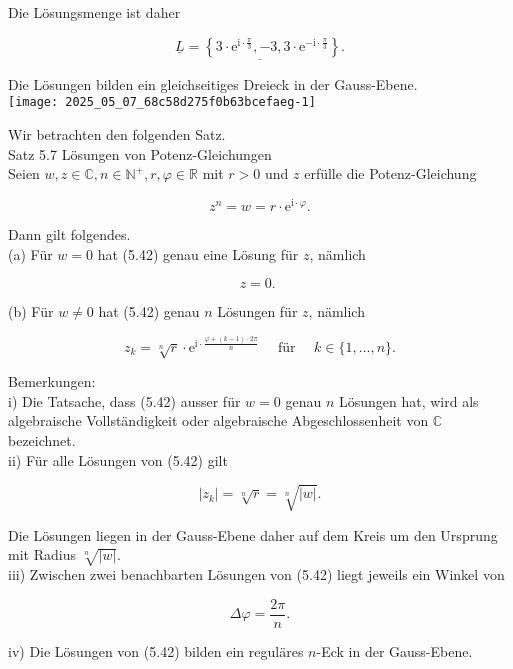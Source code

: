 \documentclass[10pt]{article}
\begin{document}
Die Lösungsmenge ist daher


\begin{equation*}
\underline{\underline{L}=\left\{3 \cdot \mathrm{e}^{\mathrm{i} \cdot \frac{\pi}{3}},-3,3 \cdot \mathrm{e}^{-\mathrm{i} \cdot \frac{\pi}{3}}\right\} .} \tag{5.41}
\end{equation*}


Die Lösungen bilden ein gleichseitiges Dreieck in der Gauss-Ebene.\\
\texttt{[image: 2025\_05\_07\_68c58d275f0b63bcefaeg-1]}

Wir betrachten den folgenden Satz.\\
Satz 5.7 Lösungen von Potenz-Gleichungen\\
Seien $w, z \in \mathbb{C}, n \in \mathbb{N}^{+}, r, \varphi \in \mathbb{R}$ mit $r>0$ und $z$ erfülle die Potenz-Gleichung


\begin{equation*}
z^{n}=w=r \cdot \mathrm{e}^{\mathrm{i} \cdot \varphi} . \tag{5.42}
\end{equation*}


Dann gilt folgendes.\\
(a) Für $w=0$ hat (5.42) genau eine Lösung für $z$, nämlich


\begin{equation*}
z=0 \text {. } \tag{5.43}
\end{equation*}


(b) Für $w \neq 0$ hat (5.42) genau $n$ Lösungen für $z$, nämlich


\begin{equation*}
z_{k}=\sqrt[n]{r} \cdot \mathrm{e}^{\mathrm{i} \cdot \frac{\varphi+(k-1) \cdot 2 \pi}{n}} \quad \text { für } \quad k \in\{1, \ldots, n\} . \tag{5.44}
\end{equation*}


Bemerkungen:\\
i) Die Tatsache, dass (5.42) ausser für $w=0$ genau $n$ Lösungen hat, wird als algebraische Vollständigkeit oder algebraische Abgeschlossenheit von $\mathbb{C}$ bezeichnet.\\
ii) Für alle Lösungen von (5.42) gilt


\begin{equation*}
\left|z_{k}\right|=\sqrt[n]{r}=\sqrt[n]{|w|} . \tag{5.45}
\end{equation*}


Die Lösungen liegen in der Gauss-Ebene daher auf dem Kreis um den Ursprung mit Radius $\sqrt[n]{|w|}$.\\
iii) Zwischen zwei benachbarten Lösungen von (5.42) liegt jeweils ein Winkel von


\begin{equation*}
\Delta \varphi=\frac{2 \pi}{n} . \tag{5.46}
\end{equation*}


iv) Die Lösungen von (5.42) bilden ein reguläres $n$-Eck in der Gauss-Ebene.
\end{document}
